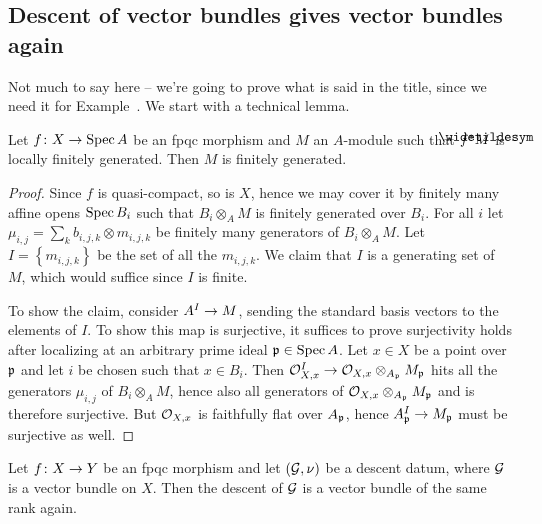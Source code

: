 \documentclass[a4paper,parskip=half,numbers=enddot, DIV=12]{scrreprt}
\begin{document}
\subsection{Descent of vector bundles gives vector bundles again}
Not much to say here -- we're going to prove what is said in the title, since we need it for Example~. We start with a technical lemma.
\begin{lem}
	Let $f\colon X\morphism \Spec A$ be an fpqc morphism and $M$ an $A$-module such that $f^*\snake{M}$ is locally finitely generated. Then $M$ is finitely generated.
\end{lem}
\begin{proof}
	Since $f$ is quasi-compact, so is $X$, hence we may cover it by finitely many affine opens $\operatorname{Spec} B_i$ such that $B_i\otimes_AM$ is finitely generated over $B_i$. For all $i$ let $\mu_{i,j}=\sum_k b_{i,j,k}\otimes m_{i,j,k}$ be finitely many generators of $B_i\otimes_AM$. Let $I=\left\{m_{i,j,k}\right\}$ be the set of all the $m_{i,j,k}$. We claim that $I$ is a generating set of $M$, which would suffice since $I$ is finite.
	
	To show the claim, consider $A^I\morphism M$, sending the standard basis vectors to the elements of $I$. To show this map is surjective, it suffices to prove surjectivity holds after localizing at an arbitrary prime ideal $\mathfrak{p}\in\operatorname{Spec} A$. Let $x\in X$ be a point over $\mathfrak{p}$ and let $i$ be chosen such that $x\in B_i$. Then $\Oo_{X,x}^I\morphism \Oo_{X,x}\otimes_{A_\pp}M_\pp$ hits all the generators $\mu_{i,j}$ of $B_i\otimes_AM$, hence also all generators of $\mathcal{O}_{X,x}\otimes_{A_{\mathfrak{p}}}M_{\mathfrak{p}}$ and is therefore surjective. But $\mathcal{O}_{X,x}$ is faithfully flat over $A_{\mathfrak{p}}$, hence $A_\pp^I\morphism M_\pp$ must be surjective as well.
\end{proof}
\begin{lem}
	Let $f\colon X\morphism Y$ be an fpqc morphism and let $(\mathcal{G},\nu)$ be a descent datum, where $\mathcal{G}$ is a vector bundle on $X$. Then the descent of $\mathcal{G}$ is a vector bundle of the same rank again.
\end{lem}
\end{document}
